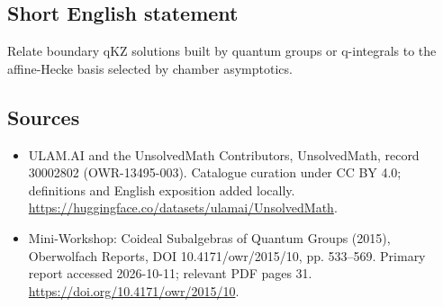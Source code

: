 \documentclass[11pt]{article}
\begin{document}
\subsection{Short English statement}
Relate boundary qKZ solutions built by quantum groups or q-integrals to the affine-Hecke basis selected by chamber asymptotics.
\subsection{Sources}
\begin{itemize}
\item[\hypertarget{source:30002802:1}{S1}] ULAM.AI and the UnsolvedMath Contributors, UnsolvedMath, record 30002802 (OWR-13495-003). Catalogue curation under CC BY 4.0; definitions and English exposition added locally.
\url{https://huggingface.co/datasets/ulamai/UnsolvedMath}.
\item[\hypertarget{source:30002802:2}{S2}] Mini-Workshop: Coideal Subalgebras of Quantum Groups (2015), Oberwolfach Reports, DOI 10.4171/owr/2015/10, pp. 533--569. Primary report accessed 2026-10-11; relevant PDF pages 31.
\url{https://doi.org/10.4171/owr/2015/10}.
\end{itemize}
\label{end:30002802}
\end{document}
